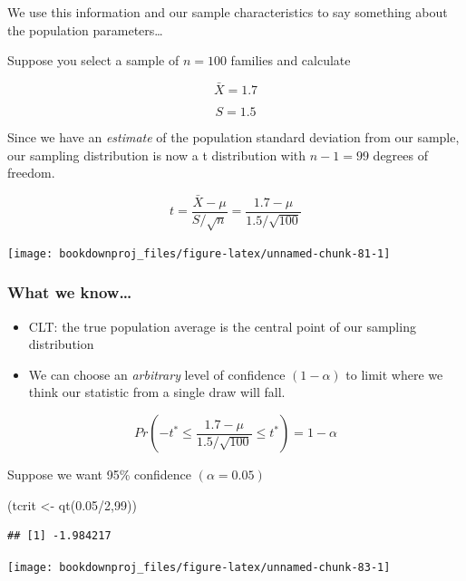 \documentclass[
]{book}
\newenvironment{Shaded}{\begin{snugshade}}{\end{snugshade}}
\newcommand{\DecValTok}[1]{\textcolor[rgb]{0.00,0.00,0.81}{#1}}
\newcommand{\FloatTok}[1]{\textcolor[rgb]{0.00,0.00,0.81}{#1}}
\newcommand{\FunctionTok}[1]{\textcolor[rgb]{0.00,0.00,0.00}{#1}}
\newcommand{\NormalTok}[1]{#1}
\newcommand{\OtherTok}[1]{\textcolor[rgb]{0.56,0.35,0.01}{#1}}
\newcommand{\SpecialCharTok}[1]{\textcolor[rgb]{0.00,0.00,0.00}{#1}}
\begin{document}
We use this information and our sample characteristics to say something about the population parameters\ldots{}

Suppose you select a sample of \(n=100\) families and calculate

\[\bar{X} = 1.7\]

\[S = 1.5\]

Since we have an \emph{estimate} of the population standard deviation from our sample, our sampling distribution is now a t distribution with \(n-1 = 99\) degrees of freedom.

\[ t = \frac{\bar{X}-\mu}{S/\sqrt{n}}=\frac{1.7-\mu}{1.5/\sqrt{100}}\]

\begin{center}\texttt{[image: bookdownproj\_files/figure-latex/unnamed-chunk-81-1]} \end{center}

\hypertarget{what-we-know}{%
\subsubsection*{What we know\ldots{}}\label{what-we-know}}

\begin{itemize}
\item
  CLT: the true population average is the central point of our sampling distribution
\item
  We can choose an \emph{arbitrary} level of confidence \((1-\alpha)\) to limit where we think our statistic from a single draw will fall.
\end{itemize}

\[Pr(-t^* \leq \frac{1.7-\mu}{1.5/\sqrt{100}} \leq t^*) = 1-\alpha\]

Suppose we want 95\% confidence \((\alpha = 0.05)\)

\begin{Shaded}
\begin{Highlighting}[]
\NormalTok{(tcrit }\OtherTok{\textless{}{-}} \FunctionTok{qt}\NormalTok{(}\FloatTok{0.05}\SpecialCharTok{/}\DecValTok{2}\NormalTok{,}\DecValTok{99}\NormalTok{))}
\end{Highlighting}
\end{Shaded}

\begin{verbatim}
## [1] -1.984217
\end{verbatim}

\begin{center}\texttt{[image: bookdownproj\_files/figure-latex/unnamed-chunk-83-1]} \end{center}
\end{document}
